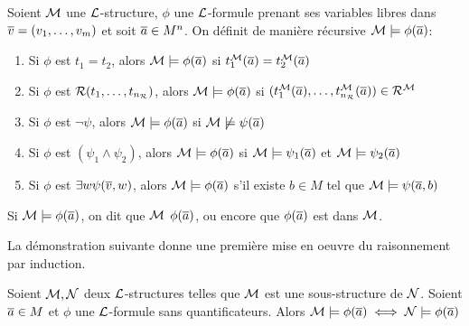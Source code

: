 \begin{defi}
Soient $\mathcal{M}$ une $\mathcal{L}$-structure, $\phi$ une $\mathcal{L}$-formule prenant ses variables libres dans $ \overline{v} = (v_1,\dots,v_m)$
et soit $\overline{a} \in M^n$. On définit de manière récursive $\mathcal{M} \models \phi(\overline{a})$:
\begin{enumerate}
\item Si $\phi$ est $t_1 = t_2$, alors $\mathcal{M} \models \phi(\overline{a})$ si $t_1^{\mathcal{M}}(\overline{a}) = t_2^{\mathcal{M}}(\overline{a})$
\item Si $\phi$ est $\mathcal{R} (t_1,\dots,t_{n_{\mathcal{R}}})$, alors $\mathcal{M} \models \phi(\overline{a})$ si $(t_1^{\mathcal{M}}(\overline{a}),\dots,t_{n_{\mathcal{R}}}^{\mathcal{M}}(\overline{a})) \in \mathcal{R}^{\mathcal{M}}$
\item Si $\phi$ est $\neg \psi$, alors $\mathcal{M} \models \phi(\overline{a})$ si $\mathcal{M} \not\models \psi(\overline{a})$
\item Si $\phi$ est $(\psi_1 \wedge \psi_2)$, alors $\mathcal{M} \models \phi(\overline{a})$ si $\mathcal{M} \models \psi_1(\overline{a})$ et $\mathcal{M} \models \psi_2(\overline{a})$
\item Si $\phi$ est $\exists w \psi(\overline{v},w)$, alors $\mathcal{M} \models \phi(\overline{a})$ s'il existe $b \in M$ tel que $\mathcal{M} \models \psi(\overline{a},b)$
\end{enumerate}
Si $\mathcal{M} \models \phi(\overline{a})$, on dit que $\mathcal{M}$  $\phi(\overline{a})$, ou encore que $\phi(\overline{a})$ est  dans $\mathcal{M}$.
\end{defi}

\noindent La démonstration suivante donne une première mise en oeuvre du raisonnement par induction.

\begin{prop}
Soient $\mathcal{M}, \mathcal{N}$ deux $\mathcal{L}$-structures telles que $\mathcal{M}$ est une sous-structure de $\mathcal{N}$. Soient $\overline{a} \in M$ et
$\phi$ une $\mathcal{L}$-formule sans quantificateurs. Alors $\mathcal{M} \models \phi(\overline{a}) \iff \mathcal{N} \models \phi(\overline{a})$
\end{prop}

